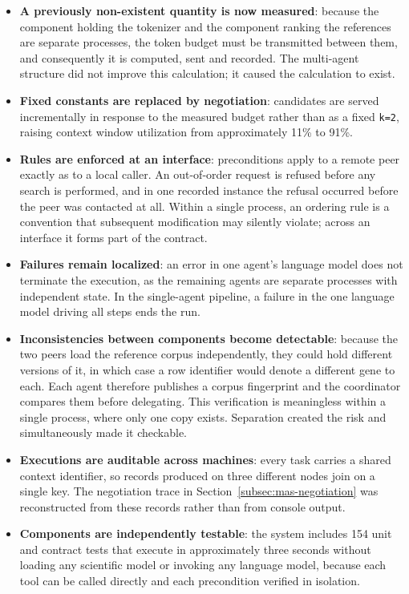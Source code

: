\begin{itemize}
    \item \textbf{A previously non-existent quantity is now measured}: because the component
    holding the tokenizer and the component ranking the references are separate processes, the
    token budget must be transmitted between them, and consequently it is computed, sent and
    recorded. The multi-agent structure did not improve this calculation; it caused the
    calculation to exist.

    \item \textbf{Fixed constants are replaced by negotiation}: candidates are served
    incrementally in response to the measured budget rather than as a fixed \texttt{k=2},
    raising context window utilization from approximately 11\% to 91\%.

    \item \textbf{Rules are enforced at an interface}: preconditions apply to a remote peer
    exactly as to a local caller. An out-of-order request is refused before any search is
    performed, and in one recorded instance the refusal occurred before the peer was contacted
    at all. Within a single process, an ordering rule is a convention that subsequent
    modification may silently violate; across an interface it forms part of the contract.

    \item \textbf{Failures remain localized}: an error in one agent's language model does not
    terminate the execution, as the remaining agents are separate processes with independent
    state. In the single-agent pipeline, a failure in the one language model driving all steps
    ends the run.

    \item \textbf{Inconsistencies between components become detectable}: because the two peers
    load the reference corpus independently, they could hold different versions of it, in which
    case a row identifier would denote a different gene to each. Each agent therefore publishes
    a corpus fingerprint and the coordinator compares them before delegating. This verification
    is meaningless within a single process, where only one copy exists. Separation created the
    risk and simultaneously made it checkable.

    \item \textbf{Executions are auditable across machines}: every task carries a shared context
    identifier, so records produced on three different nodes join on a single key. The
    negotiation trace in Section~\ref{subsec:mas-negotiation} was reconstructed from these
    records rather than from console output.

    \item \textbf{Components are independently testable}: the system includes 154 unit and
    contract tests that execute in approximately three seconds without loading any scientific
    model or invoking any language model, because each tool can be called directly and each
    precondition verified in isolation.
\end{itemize}

